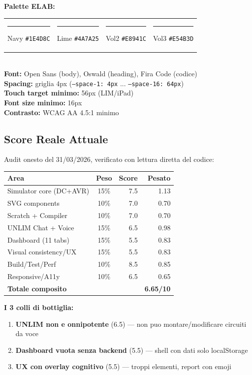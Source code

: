 \documentclass[11pt,a4paper]{article}
\begin{document}
\begin{tecnico}
\textbf{Palette ELAB:}\\[0.3em]
\begin{tabular}{llll}
\textcolor{elabnavy}{\rule{1.2cm}{0.5cm}} Navy \texttt{\#1E4D8C} &
\textcolor{elablime}{\rule{1.2cm}{0.5cm}} Lime \texttt{\#4A7A25} &
\textcolor{elaborange}{\rule{1.2cm}{0.5cm}} Vol2 \texttt{\#E8941C} &
\textcolor{elabred}{\rule{1.2cm}{0.5cm}} Vol3 \texttt{\#E54B3D} \\
\end{tabular}\\[0.5em]
\textbf{Font:} Open Sans (body), Oswald (heading), Fira Code (codice)\\
\textbf{Spacing:} griglia 4px (\texttt{--space-1: 4px} ... \texttt{--space-16: 64px})\\
\textbf{Touch target minimo:} 56px (LIM/iPad)\\
\textbf{Font size minimo:} 16px\\
\textbf{Contrasto:} WCAG AA 4.5:1 minimo
\end{tecnico}

\subsection{Score Reale Attuale}

Audit onesto del 31/03/2026, verificato con lettura diretta del codice:

\begin{tabularx}{\textwidth}{Xcrr}
\toprule
\textbf{Area} & \textbf{Peso} & \textbf{Score} & \textbf{Pesato} \\
\midrule
Simulator core (DC+AVR) & 15\% & 7.5 & 1.13 \\
SVG components & 10\% & 7.0 & 0.70 \\
Scratch + Compiler & 10\% & 7.0 & 0.70 \\
UNLIM Chat + Voice & 15\% & 6.5 & 0.98 \\
Dashboard (11 tabs) & 15\% & 5.5 & 0.83 \\
Visual consistency/UX & 15\% & 5.5 & 0.83 \\
Build/Test/Perf & 10\% & 8.5 & 0.85 \\
Responsive/A11y & 10\% & 6.5 & 0.65 \\
\midrule
\textbf{Totale composito} & & & \textbf{6.65/10} \\
\bottomrule
\end{tabularx}

\begin{attenzione}
\textbf{I 3 colli di bottiglia:}
\begin{enumerate}[leftmargin=1.5em]
  \item \textbf{UNLIM non e onnipotente} (6.5) --- non puo montare/modificare circuiti da voce
  \item \textbf{Dashboard vuota senza backend} (5.5) --- shell con dati solo localStorage
  \item \textbf{UX con overlay cognitivo} (5.5) --- troppi elementi, report con emoji
\end{enumerate}
\end{attenzione}
\end{document}
